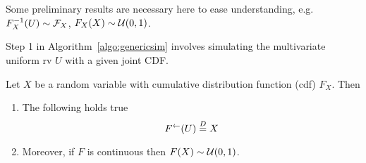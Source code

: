 \begin{rem}
	Some preliminary results are necessary here to ease understanding, e.g. $F_X^{-1}(U) \sim \mathcal{F}_X$, $F_X(X) \sim \mathcal{U}(0,1)$. 
	
	Step 1 in Algorithm~\ref{algo:genericsim} involves simulating the multivariate uniform rv $U$ with a given joint CDF. \remend 
\end{rem}

Let $X$ be a random variable with cumulative distribution function (cdf) $F_X$. Then
\begin{wrapfigure}{r}{3.5cm}
\end{wrapfigure}
	\begin{enumerate}
	\item The following holds true
	\begin{equation}
		F^{\leftarrow}(U) \overset{D}{=} X
	\end{equation}
	\item Moreover, if $F$ is continuous then $	F(X) \sim \mathcal{U}(0,1)$.
\end{enumerate}